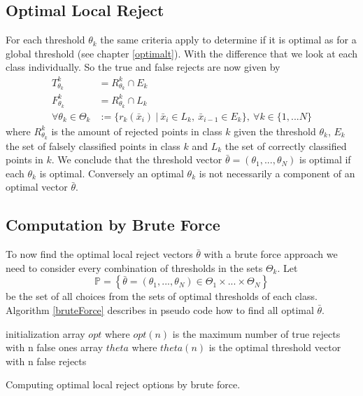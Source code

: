 \subsection{Optimal Local Reject}
For each threshold $\theta_k$ the same criteria apply to determine if it is optimal as for a global threshold (see chapter \ref{optimalt}). With the difference that we look at each class individually. So the true and false rejects are now given by
\begin{align} 
T_{\theta_k}^k &= R_{\theta_k}^k \cap E_k \\ 
F_{\theta_k}^k &= R_{\theta_k}^k \cap L_k \\
\forall \theta_k \in \Theta_k &:= \{r_k(\bar{x}_i) \ | \ \bar{x}_i \in L_k, \ \bar{x}_{i-1} \in E_k\}, \ \forall k \in \{1,...N\}
\end{align}
where $R_{\theta_k}^k$ is the amount of rejected points in class $k$ given the threshold $\theta_k$, $E_k$ the set of falsely classified points in class $k$ and $L_k$ the set of correctly classified points in $k$. We conclude that the threshold vector $\bar{\theta}=(\theta_1,...,\theta_N)$ is optimal if each $\theta_k$ is optimal. Conversely an optimal $\theta_k$ is not necessarily a component of an optimal vector $\bar{\theta}$.


\subsection{Computation by Brute Force}
To now find the optimal local reject vectors $\bar{\theta}$ with a brute force approach we need to consider every combination of thresholds in the sets $\Theta_k$. Let
$$ \mathbb{P} = \left\{\bar{\theta} = \left(\theta_1,...,\theta_N\right) \in \Theta_1 \times ... \times \Theta_N \right\} $$
be the set of all choices from the sets of optimal thresholds of each class. Algorithm \ref{bruteForce} describes in pseudo code how to find all optimal $\bar{\theta}$.

\begin{algorithm}[!htbp]
 initialization\;
 array $opt$ where $opt(n)$ is the maximum number of true rejects with n false ones \;
 array $theta$ where $theta(n)$ is the optimal threshold vector with n false rejects \; 
 \BlankLine \BlankLine
 \caption{Computing optimal local reject options by brute force.}
 \label{bruteForce}
\end{algorithm}

